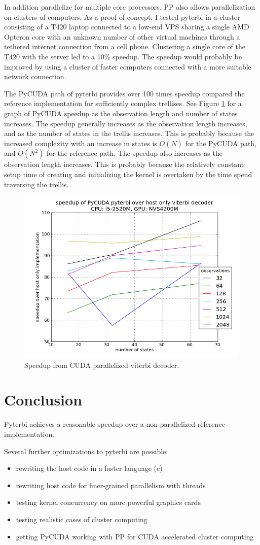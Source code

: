 \documentclass[journal,onecolumn]{IEEEtran}
\begin{document}
In addition parallelize for multiple core processors, PP also allows parallelization on clusters of computers. As a proof of concept, I tested pyterbi in a cluster consisting of a T420 laptop connected to a low-end VPS sharing a single AMD Opteron core with an unknown number of other virtual machines through a tethered internet connection from a cell phone. Clustering a single core of the T420 with the server led to a 10\% speedup. The speedup would probably be improved by using a cluster of faster computers connected with a more suitable network connection.

The PyCUDA path of pyterbi provides over 100 times speedup compared the reference implementation for sufficiently complex trellises. See Figure \ref{fig_rcuda} for a graph of PyCUDA speedup as the observation length and number of states increases. The speedup generally increases as the observation length increases, and as the number of states in the trellis increases. This is probably because the increased complexity with an increase in states is $O(N)$ for the PyCUDA path, and $O(N^2)$ for the reference path. The speedup also increases as the observation length increases. This is probably because the relatively constant setup time of creating and initializing the kernel is overtaken by the time spend traversing the trellis.

\begin{figure}[!t]
    \centering
    \includegraphics[width=.5 \linewidth]{figures/speedupgraphcuda.png}
    \caption{Speedup from CUDA parallelized viterbi decoder.}
    \label{fig_rcuda}
\end{figure}


\section{Conclusion}
Pyterbi achieves a reasonable speedup over a non-parallelized reference implementation.

Several further optimizations to pyterbi are possible:
\begin{itemize}
    \item rewriting the host code in a faster language (c)
    \item rewriting host code for finer-grained parallelism with threads
    \item testing kernel concurrency on more powerful graphics cards
    \item testing realistic cases of cluster computing
    \item getting PyCUDA working with PP for CUDA accelerated cluster computing 
\end{itemize}
\end{document}
